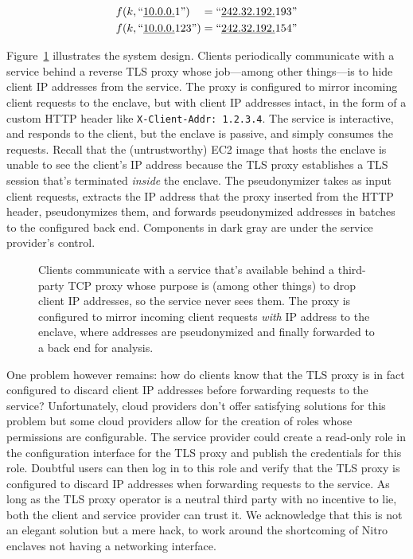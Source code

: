 \begin{align}
f(k, \textrm{``\underline{10.0.0.}1''})\phantom{23} = \textrm{``\underline{242.32.192.}193''} \\
f(k, \textrm{``\underline{10.0.0.}123''}) = \textrm{``\underline{242.32.192.}154''}
\end{align}

Figure~\ref{fig:address-anonymizer} illustrates the system design.  Clients
periodically communicate with a service behind a reverse TLS proxy whose
job---among other things---is to hide client IP addresses from the service.  The
proxy is configured to mirror incoming client requests to the enclave, but with
client IP addresses intact, in the form of a custom HTTP header like
\texttt{X-Client-Addr: 1.2.3.4}.  The service is interactive, and responds to
the client, but the enclave is passive, and simply consumes the requests.
Recall that the (untrustworthy) EC2 image that hosts the enclave is unable to
see the client's IP address because the TLS proxy establishes a TLS session
that's terminated \emph{inside} the enclave.  The pseudonymizer takes as input
client requests, extracts the IP address that the proxy inserted from the HTTP
header, pseudonymizes them, and forwards pseudonymized addresses in batches to
the configured back end.  Components in dark gray are under the service
provider's control.

\begin{figure}[t]
\centering

\caption{Clients communicate with a service that's available behind a
  third-party TCP proxy whose purpose is (among other things) to drop client IP
  addresses, so the service never sees them.  The proxy is configured to mirror
  incoming client requests \emph{with} IP address to the enclave, where
  addresses are pseudonymized and finally forwarded to a back end for analysis.}
\label{fig:address-anonymizer}
\end{figure}

One problem however remains: how do clients know that the TLS proxy is in fact
configured to discard client IP addresses before forwarding requests to the
service?  Unfortunately, cloud providers don't offer satisfying solutions for
this problem but some cloud providers allow for the creation of roles whose
permissions are configurable.  The service provider could create a read-only
role in the configuration interface for the TLS proxy and publish the
credentials for this role.  Doubtful users can then log in to this role and
verify that the TLS proxy is configured to discard IP addresses when forwarding
requests to the service.  As long as the TLS proxy operator is a neutral third
party with no incentive to lie, both the client and service provider can trust
it.  We acknowledge that this is not an elegant solution but a mere hack, to
work around the shortcoming of Nitro enclaves not having a networking interface.

